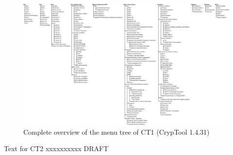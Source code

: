 

\clearpage
\begin{figure}[hb]
\begin{center}
\vspace{-30pt}
\includegraphics[scale=0.35, angle=270]
                {figures/CT1-menutree-en}
\caption{Complete overview of the menu tree of CT1 (CrypTool 1.4.31)} 
\label{menuoverview}
\end{center}
\end{figure}
\clearpage


\noindent Text for CT2 xxxxxxxxxx DRAFT


